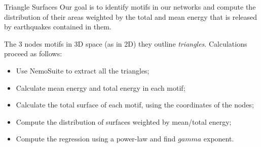\begin{frame}{Triangle Surfaces}
Our goal is to identify motifs in our networks and compute the distribution of their areas weighted by the total and mean energy that is released by earthquakes contained in them.\par 

\vspace{5mm} 

The 3 nodes motifs in 3D space (as in 2D) they outline {\it triangles}. Calculations proceed as follows:
\begin{itemize}
	\item Use NemoSuite to extract all the triangles;
	\item Calculate mean energy and total energy in each motif;
	\item Calculate the total surface of each motif, using the coordinates of the nodes;
	\item Compute the distribution of surfaces weighted by mean/total energy;
	\item Compute the regression using a power-law and find $gamma$ exponent. 
\end{itemize}
\end{frame}



